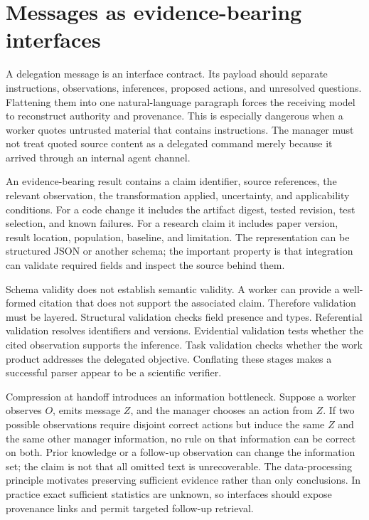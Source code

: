 \section{Messages as evidence-bearing interfaces}\label{sec:C21:messages}
A delegation message is an interface contract. Its payload should separate instructions, observations, inferences, proposed actions, and unresolved questions. Flattening them into one natural-language paragraph forces the receiving model to reconstruct authority and provenance. This is especially dangerous when a worker quotes untrusted material that contains instructions. The manager must not treat quoted source content as a delegated command merely because it arrived through an internal agent channel.

An evidence-bearing result contains a claim identifier, source references, the relevant observation, the transformation applied, uncertainty, and applicability conditions. For a code change it includes the artifact digest, tested revision, test selection, and known failures. For a research claim it includes paper version, result location, population, baseline, and limitation. The representation can be structured JSON or another schema; the important property is that integration can validate required fields and inspect the source behind them.

Schema validity does not establish semantic validity. A worker can provide a well-formed citation that does not support the associated claim. Therefore validation must be layered. Structural validation checks field presence and types. Referential validation resolves identifiers and versions. Evidential validation tests whether the cited observation supports the inference. Task validation checks whether the work product addresses the delegated objective. Conflating these stages makes a successful parser appear to be a scientific verifier.

Compression at handoff introduces an information bottleneck. Suppose a worker observes $O$, emits message $Z$, and the manager chooses an action from $Z$. If two possible observations require disjoint correct actions but induce the same $Z$ and the same other manager information, no rule on that information can be correct on both. Prior knowledge or a follow-up observation can change the information set; the claim is not that all omitted text is unrecoverable. The data-processing principle motivates preserving sufficient evidence rather than only conclusions. In practice exact sufficient statistics are unknown, so interfaces should expose provenance links and permit targeted follow-up retrieval.

